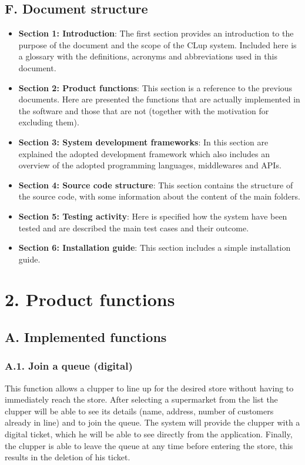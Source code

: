 \section{F. Document structure}

\begin{itemize}
\item 
    \textbf{Section 1: Introduction}: The first section provides an introduction to the purpose of the document and the scope of the CLup system. Included here is a glossary with the definitions, acronyms and abbreviations used in this document.
\item 
    \textbf{Section 2: Product functions}: This section is a reference to the previous documents. Here are presented the functions that are actually implemented in the software and those that are not (together with the motivation for excluding them).
\item 
    \textbf{Section 3: System development frameworks}: In this section are explained the adopted development framework which also includes an overview of the adopted programming languages, middlewares and APIs.
\item 
    \textbf{Section 4: Source code structure}: This section contains the structure of the source code, with some information about the content of the main folders.
\item 
    \textbf{Section 5: Testing activity}: Here is specified how the system have been tested and are described the main test cases and their outcome.
\item 
    \textbf{Section 6: Installation guide}: This section includes a simple installation guide.
\end{itemize}

\chapter{2. Product functions}

\section{A. Implemented functions}

\subsection{A.1. Join a queue (digital)}

This function allows a clupper to line up for the desired store without having to immediately reach the store.
After selecting a supermarket from the list the clupper will be able to see its details (name, address, number of customers already in line) and to join the queue.
The system will provide the clupper with a digital ticket, which he will be able to see directly from the application.
Finally, the clupper is able to leave the queue at any time before entering the store, this results in the deletion of his ticket.

